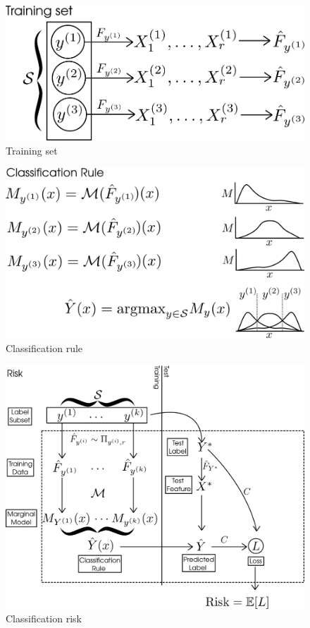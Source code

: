 \begin{figure}[h]
\centering
\includegraphics[scale = 0.4]{../extrapolation_figures/training_set.png}
\caption{Training set}\label{fig:training_set}
\end{figure}

\begin{figure}[h]
\centering
\includegraphics[scale = 0.4]{../extrapolation_figures/classification_rule.png}
\caption{Classification rule}\label{fig:classification_rule}
\end{figure}

\begin{figure}[h]
\centering
\includegraphics[scale = 0.3]{../extrapolation_figures/risk.png}
\caption{Classification risk}\label{fig:risk}
\end{figure}

